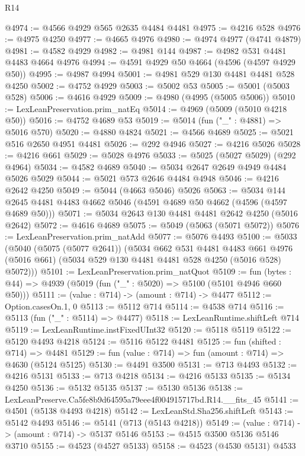 \begin{lexlean}{R14}
\begin{coremodule}
@4974 := @4566 @4929 @565 @2635 @4484 @4481
@4975 := @4216 @528
@4976 := @4975 @4250
@4977 := @4665 @4976
@4980 := @4974 @4977 (@4741 @4879)
@4981 := @4582 @4929
@4982 := @4981 @144
@4987 := @4982 @531 @4481 @4483 @4664 @4976
@4994 := @4591 @4929 @50 @4664 (@4596 (@4597 @4929 @50))
@4995 := @4987 @4994
@5001 := @4981 @529 @130 @4481 @4481 @528 @4250
@5002 := @4752 @4929
@5003 := @5002 @53
@5005 := @5001 (@5003 @528)
@5006 := @4616 @4929
@5009 := @4980 (@4995 (@5005 @5006))
@5010 := LexLeanPreservation.prim_natEq
@5014 := @4969 (@5009 (@5010 @4218 @50))
@5016 := @4752 @4689 @53
@5019 := @5014 (fun ("_" : @4881) => @5016 @570)
@5020 := @4880 @4824
@5021 := @4566 @4689
@5025 := @5021 @516 @2650 @4951 @4481
@5026 := @292 @4946
@5027 := @4216 @5026
@5028 := @4216 @661
@5029 := @5028 @4976
@5033 := @5025 (@5027 @5029) (@292 @4964)
@5034 := @4582 @4689
@5040 := @5034 @2647 @2649 @4949 @4484 @5026 @5029
@5044 := @5021 @573 @2646 @4484 @4948
@5046 := @4216 @2642 @4250
@5049 := @5044 (@4663 @5046) @5026
@5063 := @5034 @144 @2645 @4481 @4483 @4662 @5046 (@4591 @4689 @50 @4662 (@4596 (@4597 @4689 @50)))
@5071 := @5034 @2643 @130 @4481 @4481 @2642 @4250 (@5016 @2642)
@5072 := @4616 @4689
@5075 := @5049 (@5063 (@5071 @5072))
@5076 := LexLeanPreservation.prim_natAdd
@5077 := @5076 @4493
@5100 := @5033
    (@5040
      (@5075 (@5077 @2641))
      (@5034
        @662
        @531
        @4481
        @4483
        @661
        @4976
        (@5016 @661)
        (@5034 @529 @130 @4481 @4481 @528 @4250 (@5016 @528) @5072)))
@5101 := LexLeanPreservation.prim_natQuot
@5109 := fun (bytes : @44) => @4939 (@5019 (fun ("_" : @5020) => @5100 (@5101 @4946 @660 @50)))
@5111 := (value : @714) -> (amount : @714) -> @4477
@5112 := Option.casesOn.{1, 0}
@5113 := @5112 @714
@5114 := @4538 @714
@5116 := @5113 (fun ("_" : @5114) => @4477)
@5118 := LexLeanRuntime.shiftLeft @714
@5119 := LexLeanRuntime.instFixedUInt32
@5120 := @5118 @5119
@5122 := @5120 @4493 @4218
@5124 := @5116 @5122 @4481
@5125 := fun (shifted : @714) => @4481
@5129 := fun (value : @714) => fun (amount : @714) => @4630 (@5124 @5125)
@5130 := @4491 @3500
@5131 := @713 @4493
@5132 := @4216 @5131
@5133 := @713 @4218
@5134 := @4216 @5133
@5135 := @5134 @4250
@5136 := @5132 @5135
@5137 := @5130 @5136
@5138 := LexLeanPreserve.Ca5fe8b9d64595a79eee4f004915717bd.R14.__fits_45
@5141 := @4501 (@5138 @4493 @4218)
@5142 := LexLeanStd.Sha256.shiftLeft
@5143 := @5142 @4493
@5146 := @5141 (@713 (@5143 @4218))
@5149 := (value : @714) -> (amount : @714) -> @5137 @5146
@5153 := @4515 @3500 @5136 @5146 @3710
@5155 := @4523 (@4527 @5133)
@5158 := @4523 (@4530 @5131) @4533

\end{coremodule}
\end{lexlean}
